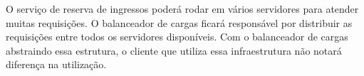 O serviço de reserva de ingressos poderá rodar em vários servidores para atender muitas requisições.
O balanceador de cargas ficará responsável por distribuir as requisições entre todos os servidores disponíveis.
Com o balanceador de cargas abstraindo essa estrutura, o cliente que utiliza essa infraestrutura
não notará diferença na utilização.
